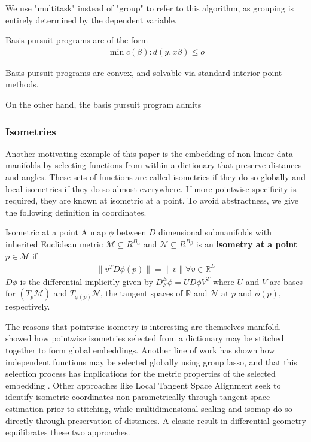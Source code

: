 
We use "multitask" instead of "group" to refer to this algorithm, as grouping is entirely determined by the dependent variable.

Basis pursuit programs are of the form 
\begin{align}
\min c(\beta) : d(y, x\beta) \leq o
\end{align}

Basis pursuit programs are convex, and solvable via standard interior point methods.

On the other hand, the basis pursuit program admits 

\subsubsection{Isometries}

Another motivating example of this paper is the embedding of non-linear data manifolds by selecting functions from within a dictionary that preserve distances and angles.
These sets of functions are called isometries if they do so globally and local isometries if they do so almost everywhere.
If more pointwise specificity is required, they are known at isometric at a point.
To avoid abstractness, we give the following definition in coordinates.
\begin{definition}{Isometric at a point}
\label{def:isometric_at_a_point}
A map $\phi$ between $D$ dimensional submanifolds with inherited Euclidean metric $\mathcal M \subseteq R^{B_\alpha}$ and $\mathcal N  \subseteq R^{B_\beta}$ is an \textbf{isometry at a point} $p \in \mathcal M$ if
\begin{align}
\| v^T D \phi (p) \| = \|v\| \forall v \in \mathbb R^D
\end{align}
$D \phi$ is the differential implicitly given by $D_{F}^E \phi = U D \phi V^T$ where $U$ and $V$ are bases for $(T_p \mathcal M)$ and $T_{\phi(p)} \mathcal N$, the tangent spaces of $\mathbb R$ and $\mathcal N$ at $p$ and $\phi(p)$, respectively.
\end{definition}

The reasons that pointwise isometry is interesting are themselves manifold.
\cite{Kohli2021-lr} showed how pointwise isometries selected from a dictionary may be stitched together to form global embeddings.
Another line of work \cite{Koelle2022-ju, Koelle2024-no} has shown how independent functions may be selected globally using group lasso, and that this selection process has implications for the metric properties of the selected embedding \cite{Koelle2022-ju}.
Other approaches like Local Tangent Space Alignment seek to identify isometric coordinates non-parametrically through tangent space estimation prior to stitching, while multidimensional scaling and isomap do so directly through preservation of distances.
A classic result in differential geometry equilibrates these two approaches.

